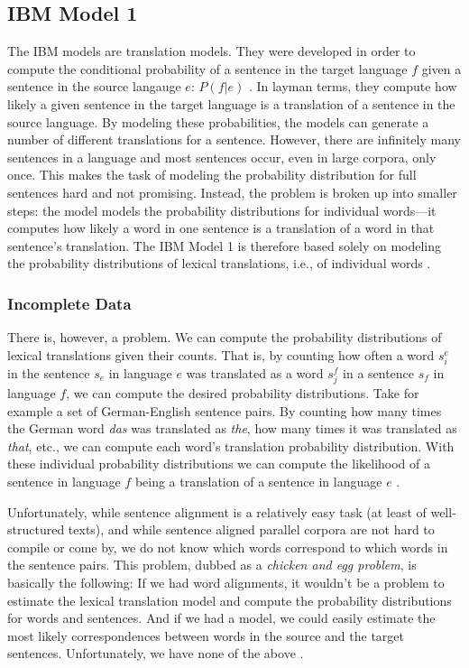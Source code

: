 \subsection{IBM Model 1}
\label{sec:ibm-model-1}
The IBM models are translation models. 
They were developed in order to compute the conditional probability of a sentence in the target language $f$ given a sentence in the source langauge $e$: $P(f|e)$ \autocite{brown-etal-1993-mathematics}. 
In layman terms, they compute how likely a given sentence in the target language is a translation of a sentence in the source language.
By modeling these probabilities, the models can generate a number of different translations for a sentence. 
However, there are infinitely many sentences in a language and most sentences occur, even in large corpora, only once. 
This makes the task of modeling the probability distribution for full sentences hard and not promising. 
Instead, the problem is broken up into smaller steps: the model models the probability distributions for individual words---it computes how likely a word in one sentence is a translation of a word in that sentence's translation. 
The IBM Model 1 is therefore based solely on modeling the probability distributions of lexical translations, i.e., of individual words \autocite[88]{koehn2009}.

\subsubsection{Incomplete Data}
There is, however, a problem. 
We can compute the probability distributions of lexical translations given their counts. 
That is, by counting how often a word $s^e_i$ in the sentence $s_e$ in language $e$ was translated as a word $s^f_j$ in a sentence $s_f$ in language $f$, we can compute the desired probability distributions. 
Take for example a set of German-English sentence pairs. By counting how many times the German word \emph{das} was translated as \emph{the}, how many times it was translated as \emph{that}, etc., we can compute each word's translation probability distribution. 
With these individual probability distributions we can compute the likelihood of a sentence in language $f$ being a translation of a sentence in language $e$ \autocite[88]{koehn2009}.

Unfortunately, while sentence alignment is a relatively easy task (at least of well-structured texts), and while sentence aligned parallel corpora are not hard to compile or come by, we do not know which words correspond to which words in the sentence pairs. 
This problem, dubbed as a \emph{chicken and egg problem}, is basically the following: If we had word alignments, it wouldn't be a problem to estimate the lexical translation model and compute the probability distributions for words and sentences. 
And if we had a model, we could easily estimate the most likely correspondences between words in the source and the target sentences. 
Unfortunately, we have none of the above \autocite[88]{koehn2009}.

